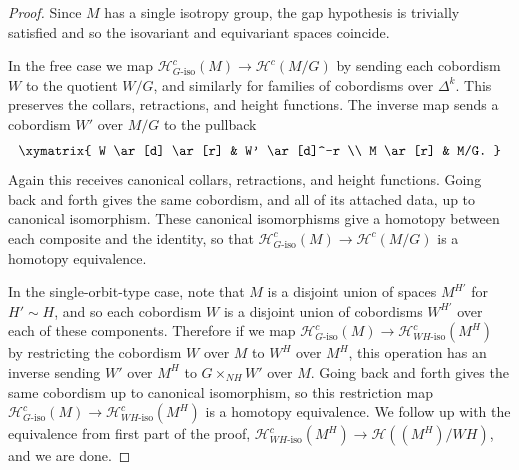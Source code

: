 \documentclass[11pt]{amsart}
\newtheorem{lem}{Lemma}[section]
\theoremstyle{definition}
\numberwithin{equation}{section}
\numberwithin{figure}{section}
\newcommand{\mc}{\mathcal}
\newcommand{\Hiso}{\mathcal{H}_{\iso}}
\newcommand{\iso}{\mathrm{iso}}
\newcommand{\dashiso}{\textrm{-}\mathrm{iso}}
\begin{document}
\begin{proof}
	Since $M$ has a single isotropy group, the gap hypothesis is trivially satisfied and so the isovariant and equivariant spaces coincide.
	
	In the free case we map $\mc H_{G\dashiso}^c(M)  \to \mc H^c(M/G)$ by sending each cobordism $W$ to the quotient $W/G$, and similarly for families of cobordisms over $\Delta^k$. This preserves the collars, retractions, and height functions. The inverse map sends a cobordism $W'$ over $M/G$ to the pullback
	\[ \xymatrix{
		W \ar[d] \ar[r] & W' \ar[d]^-r \\
		M \ar[r] & M/G.
	} \]
	Again this receives canonical collars, retractions, and height functions. Going back and forth gives the same cobordism, and all of its attached data, up to canonical isomorphism. These canonical isomorphisms give a homotopy between each composite and the identity, so that $\mc H_{G\dashiso}^c(M) \to \mc H^c(M/G)$ is a homotopy equivalence.
	
	In the single-orbit-type case, note that $M$ is a disjoint union of spaces $M^{H'}$ for $H' \sim H$, and so each cobordism $W$ is a disjoint union of cobordisms $W^{H'}$ over each of these components. Therefore if we map $\mc H_{G\dashiso}^c(M) \to \mc H_{WH\dashiso}^c(M^H)$ by restricting the cobordism $W$ over $M$ to $W^H$ over $M^H$, this operation has an inverse sending $W'$ over $M^H$ to $G \times_{NH} W'$ over $M$. Going back and forth gives the same cobordism up to canonical isomorphism, so this restriction map $\mc H_{G\dashiso}^c(M) \to \mc H_{WH\dashiso}^c(M^H)$ is a homotopy equivalence. We follow up with the equivalence from first part of the proof, $\mc H_{WH\dashiso}^c(M^H) \to \mc H((M^H)/WH)$, and we are done.
\end{proof}

%
\end{document}
